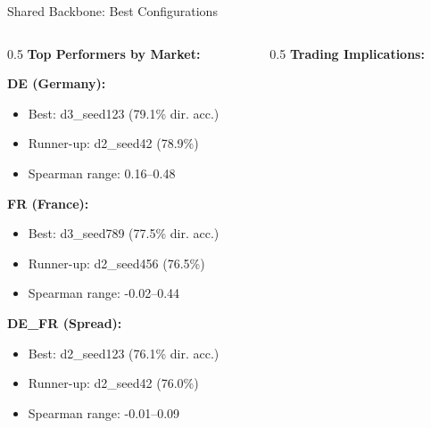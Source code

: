 \documentclass[aspectratio=169]{beamer}
\begin{document}
\begin{frame}{Shared Backbone: Best Configurations}
\begin{columns}
\begin{column}{0.5\textwidth}
\textbf{Top Performers by Market:}

\textbf{DE (Germany):}
\begin{itemize}
    \item Best: d3\_seed123 (79.1\% dir. acc.)
    \item Runner-up: d2\_seed42 (78.9\%)
    \item Spearman range: 0.16--0.48
\end{itemize}

\textbf{FR (France):}
\begin{itemize}
    \item Best: d3\_seed789 (77.5\% dir. acc.)
    \item Runner-up: d2\_seed456 (76.5\%)
    \item Spearman range: -0.02--0.44
\end{itemize}

\textbf{DE\_FR (Spread):}
\begin{itemize}
    \item Best: d2\_seed123 (76.1\% dir. acc.)
    \item Runner-up: d2\_seed42 (76.0\%)
    \item Spearman range: -0.01--0.09
\end{itemize}
\end{column}

\begin{column}{0.5\textwidth}
\textbf{Trading Implications:}

\begin{center}
\end{center}


\end{column}
\end{columns}
\end{frame}
\end{document}
